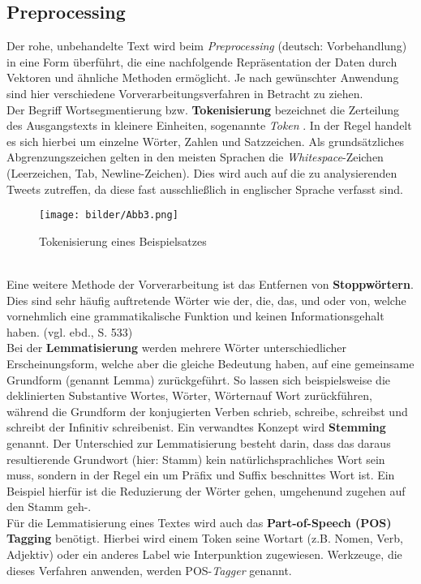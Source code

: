\subsection{Preprocessing}
Der rohe, unbehandelte Text wird beim \textit{Preprocessing} (deutsch: Vorbehandlung) in eine Form überführt, die eine nachfolgende Repräsentation der Daten durch Vektoren und ähnliche Methoden ermöglicht. Je nach gewünschter Anwendung sind hier verschiedene Vorverarbeitungsverfahren in Betracht zu ziehen.\\
Der Begriff Wortsegmentierung bzw. \textbf{Tokenisierung} bezeichnet die Zerteilung des Ausgangstexts in kleinere Einheiten, sogenannte \textit{Token} \citep{MannSch99}. In der Regel handelt es sich hierbei um einzelne Wörter, Zahlen und Satzzeichen. Als grundsätzliches Abgrenzungszeichen gelten in den meisten Sprachen die \textit{Whitespace}-Zeichen (Leerzeichen, Tab, Newline-Zeichen). Dies wird auch auf die zu analysierenden Tweets zutreffen, da diese fast ausschließlich in englischer Sprache verfasst sind.\\
\begin{figure}[htb]
	\begin{center}
		\texttt{[image: bilder/Abb3.png]}
		\caption{Tokenisierung eines Beispielsatzes}\label{tokenization}
	\end{center}
\end{figure}\\
Eine weitere Methode der Vorverarbeitung ist das Entfernen von \textbf{Stoppwörtern}. Dies sind sehr häufig auftretende Wörter wie \glqq der\grqq, \glqq die\grqq, \glqq das\grqq, \glqq und\grqq{} oder \glqq von\grqq, welche vornehmlich eine grammatikalische Funktion und keinen Informationsgehalt haben. (vgl. ebd., S. 533)\\
Bei der \textbf{Lemmatisierung} \citep{Air06} werden mehrere Wörter unterschiedlicher Erscheinungsform, welche aber die gleiche Bedeutung haben, auf eine gemeinsame Grundform (genannt Lemma) zurückgeführt.  So lassen sich beispielsweise die deklinierten Substantive \glqq Wortes\grqq, \glqq Wörter\grqq, \glqq Wörtern\grqq auf \glqq Wort\grqq{} zurückführen, während die Grundform der konjugierten Verben \glqq schrieb\grqq, \glqq schreibe\grqq, \glqq schreibst\grqq{} und \glqq schreibt\grqq{} der Infinitiv \glqq schreiben\grqq ist. Ein verwandtes Konzept wird \textbf{Stemming} \citep{Air06} genannt. Der Unterschied zur Lemmatisierung besteht darin, dass das daraus resultierende Grundwort (hier: Stamm) kein natürlichsprachliches Wort sein muss, sondern in der Regel ein um Präfix und Suffix beschnittes Wort ist. Ein Beispiel hierfür ist die Reduzierung der Wörter \glqq gehen\grqq, \glqq umgehen\grqq und \glqq zugehen\grqq{} auf den Stamm \glqq geh-\grqq.\\
Für die Lemmatisierung eines Textes wird auch das \textbf{Part-of-Speech (POS) Tagging} \citep{Kuma15} benötigt. Hierbei wird einem Token seine Wortart (z.B. Nomen, Verb, Adjektiv) oder ein anderes Label wie \glqq Interpunktion\grqq{} zugewiesen. Werkzeuge, die dieses Verfahren anwenden, werden POS-\textit{Tagger} genannt.
